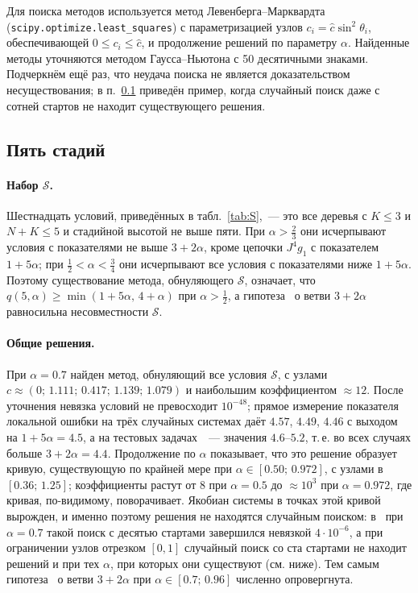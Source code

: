 \documentclass[11pt,a4paper]{article}
\theoremstyle{plain}
\theoremstyle{definition}
\begin{document}
Для поиска методов используется метод Левенберга--Марквардта (\texttt{scipy.optimize.least\_squares}) с параметризацией узлов $c_i=\hat c\sin^2\theta_i$, обеспечивающей $0\le c_i\le\hat c$, и продолжение решений по параметру $\alpha$. Найденные методы уточняются методом Гаусса--Ньютона с 50 десятичными знаками. Подчеркнём ещё раз, что неудача поиска не является доказательством несуществования; в п.~\ref{sec:s5} приведён пример, когда случайный поиск даже с сотней стартов не находит существующего решения.

\subsection{Пять стадий}\label{sec:s5}

\paragraph{Набор $\mathcal S$.} Шестнадцать условий, приведённых в табл.~\ref{tab:S},~--- это все деревья с $K\le3$ и $N+K\le5$ и стадийной высотой не выше пяти. При $\alpha>\frac23$ они исчерпывают условия с показателями не выше $3+2\alpha$, кроме цепочки $J^4g_1$ с показателем $1+5\alpha$; при $\frac12<\alpha<\frac34$ они исчерпывают все условия с показателями ниже $1+5\alpha$. Поэтому существование метода, обнуляющего $\mathcal S$, означает, что $q(5,\alpha)\ge\min(1+5\alpha,\,4+\alpha)$ при $\alpha>\frac12$, а гипотеза~\cite{PrikBarriers} о ветви $3+2\alpha$ равносильна несовместности $\mathcal S$.



\paragraph{Общие решения.} При $\alpha=0.7$ найден метод, обнуляющий все условия $\mathcal S$, с узлами $c\approx(0;\,1.111;\,0.417;\,1.139;\,1.079)$ и наибольшим коэффициентом $\approx12$. После уточнения невязка условий не превосходит $10^{-48}$; прямое измерение показателя локальной ошибки на трёх случайных системах даёт $4.57$, $4.49$, $4.46$ с выходом на $1+5\alpha=4.5$, а на тестовых задачах~\cite{PrikBarriers}~--- значения $4.6$--$5.2$, т.\,е. во всех случаях больше $3+2\alpha=4.4$. Продолжение по $\alpha$ показывает, что это решение образует кривую, существующую по крайней мере при $\alpha\in[0.50;\,0.972]$, с узлами в $[0.36;\,1.25]$; коэффициенты растут от $8$ при $\alpha=0.5$ до $\approx10^3$ при $\alpha=0.972$, где кривая, по-видимому, поворачивает. Якобиан системы в точках этой кривой вырожден, и именно поэтому решения не находятся случайным поиском: в~\cite{PrikBarriers} при $\alpha=0.7$ такой поиск с десятью стартами завершился невязкой $4\cdot10^{-6}$, а при ограничении узлов отрезком $[0,1]$ случайный поиск со ста стартами не находит решений и при тех $\alpha$, при которых они существуют (см. ниже). Тем самым гипотеза~\cite{PrikBarriers} о ветви $3+2\alpha$ при $\alpha\in[0.7;\,0.96]$ численно опровергнута.
\end{document}
